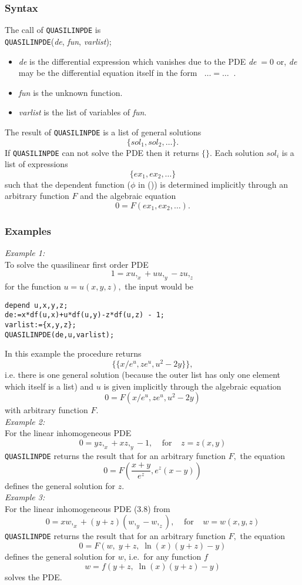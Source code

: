 \subsubsection{Syntax}
The call of \texttt{QUASILINPDE} is \\
\texttt{QUASILINPDE}(\textit{de}, \textit{fun}, \textit{varlist});
\begin{itemize}
\item
\textit{de} is the differential expression which vanishes due to the PDE
\textit{de}$\; = 0$ or, \textit{de} may be the differential equation itself in the
form $\;\;\ldots = \ldots\;\;$.
\item
\textit{fun} is the unknown function.
\item
\textit{varlist} is the list of variables of \textit{fun}.
\end{itemize}
The result of \texttt{QUASILINPDE} is a list of general solutions
\[      \{\textit{sol}_1, \textit{sol}_2, \ldots \}.  \]
If \texttt{QUASILINPDE} can not solve the PDE then it returns $\{\}$.
Each solution $\textit{sol}_i$ is a list of expressions
\[      \{\textit{ex}_1, \textit{ex}_2, \ldots \}  \]
such that the dependent function ($\phi$ in ()) is determined
implicitly through an arbitrary function $F$ and the algebraic
equation \[ 0 = F(\textit{ex}_1, \textit{ex}_2, \ldots). \]
\subsubsection{Examples}
\emph{Example 1:}\\
To solve the quasilinear first order PDE \[1 = xu,_x + uu,_y - zu,_z\]
for the function $u = u(x,y,z),$ the input would be
\begin{small}
\begin{verbatim}
depend u,x,y,z;
de:=x*df(u,x)+u*df(u,y)-z*df(u,z) - 1;
varlist:={x,y,z};
QUASILINPDE(de,u,varlist);
\end{verbatim}
\end{small}
In this example the procedure returns
\[\{ \{ x/e^u, ze^u, u^2 - 2y \} \},\]
i.e. there is one general solution (because the outer list has only one
element which itself is a list) and $u$ is given implicitly through
the algebraic equation
\[ 0 = F(x/e^u, ze^u, u^2 - 2y)\]
with arbitrary function $F.$ \\
\emph{Example 2:}\\
For the linear inhomogeneous PDE
\[ 0 = y z,_x + x z,_y - 1, \;\;\;\;\mbox{for}\;\;\;\;z=z(x,y)\]
\texttt{QUASILINPDE} returns the result that for an arbitrary function $F,$ the
equation
\[ 0 = F\left(\frac{x+y}{e^z},e^z(x-y)\right) \]
defines the general solution for $z$. \\
\emph{Example 3:}\\
For the linear inhomogeneous PDE (3.8) from \cite{Kamke:Vol2}
\[ 0 = x w,_x + (y+z)(w,_y - w,_z), \;\;\;\;\mbox{for}\;\;\;\;w=w(x,y,z)\]
\texttt{QUASILINPDE} returns the result
that for an arbitrary function $F,$ the equation
\[ 0 = F\left(w, \;y+z, \;\ln(x)(y+z)-y\right) \]
defines the general solution for $w$, i.e.\ for any function $f$
\[ w = f\left(y+z, \;\ln(x)(y+z)-y\right) \]
solves the PDE.
